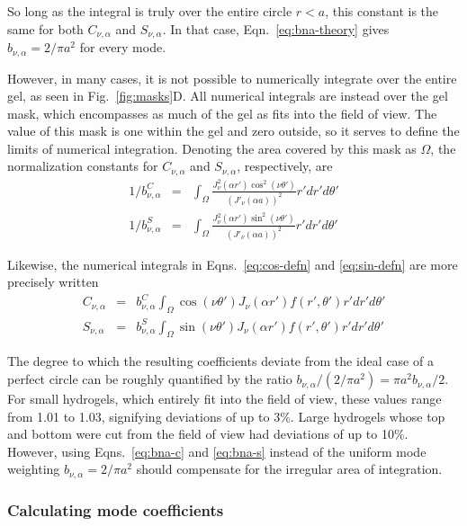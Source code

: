 So long as the integral is truly over the entire circle $r<a$, this constant is the same for both $C_{\nu,\alpha}$ and $S_{\nu,\alpha}$.  In that case, Eqn.~\ref{eq:bna-theory} gives $b_{\nu,\alpha} = 2/\pi a^2$ for every mode.

However, in many cases, it is not possible to numerically integrate over the entire gel, as seen in Fig.~\ref{fig:masks}D.  All numerical integrals are instead over the gel mask, which encompasses as much of the gel as fits into the field of view.  The value of this mask is one within the gel and zero outside, so it serves to define the limits of numerical integration.  Denoting the area covered by this mask as $\Omega$, the normalization constants for $C_{\nu,\alpha}$ and $S_{\nu,\alpha}$, respectively, are
\begin{eqnarray}
1/b_{\nu,\alpha}^C  &= & \int_\Omega \frac{ J_\nu^2(\alpha r')\cos^2(\nu\theta') }{\left(J'_\nu (\alpha a)\right)^2} r' dr' d\theta' \label{eq:bna-c} \\
1/b_{\nu,\alpha}^S  &=  &\int_\Omega \frac{ J_\nu^2(\alpha r')\sin^2(\nu\theta') }{\left(J'_\nu (\alpha a)\right)^2} r' dr' d\theta' \label{eq:bna-s}
\end{eqnarray}

Likewise, the numerical integrals in Eqns.~\ref{eq:cos-defn} and \ref{eq:sin-defn} are more precisely written 
\begin{eqnarray}
C_{\nu,\alpha} & = &b_{\nu,\alpha}^C \int_\Omega \cos\left(\nu\theta'\right) J_\nu(\alpha r')f(r',\theta') r' dr' d\theta' \label{eq:cos-defn2}\\
S_{\nu,\alpha} & = & b_{\nu,\alpha}^S\int_\Omega \sin\left(\nu\theta'\right) J_\nu(\alpha r') f(r',\theta') r' dr' d\theta' \label{eq:sin-defn2}
\end{eqnarray}

The degree to which the resulting coefficients deviate from the ideal case of a perfect circle can be roughly quantified by the ratio $b_{\nu,\alpha} /(2/\pi a^2) = \pi a^2 b_{\nu,\alpha} /2$. For small hydrogels, which entirely fit into the field of view, these values range from 1.01 to 1.03, signifying deviations of up to 3\%.  Large hydrogels whose top and bottom were cut from the field of view had deviations of up to 10\%.  However, using Eqns.~\ref{eq:bna-c} and \ref{eq:bna-s} instead of the uniform mode weighting $b_{\nu,\alpha} = 2/\pi a^2$ should compensate for the irregular area of integration.

\subsubsection{Calculating mode coefficients}
\label{sec:calcCoeffs}

